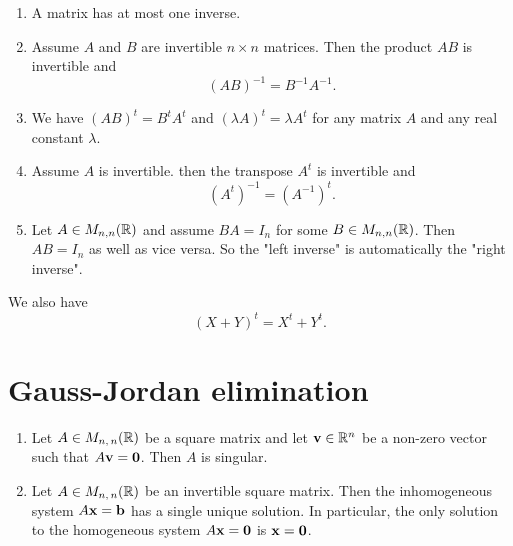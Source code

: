 \documentclass[10pt, a4paper]{article}
\begin{document}
\begin{proposition}\phantom{}
    \begin{enumerate}[label = (\roman*)]
        \item A matrix has at most one inverse.
        \item Assume $A$ and $B$ are invertible $n \times n$ matrices. Then the product $AB$ is invertible and
        \[
        (AB) ^ {-1} = B ^ {-1}A ^ {-1}.
        \]
        \item We have $(AB) ^ t = B ^ t A ^ t$ and $(\lambda A) ^ t = \lambda A ^ t$ for any matrix $A$ and any real constant $\lambda$.
        \item Assume $A$ is invertible. then the transpose $A ^ t$ is invertible and
        \[
        (A ^ t) ^ {-1} = (A ^ {-1}) ^ t.
        \]
        \item Let $A \in M_{n, n}(\mathbb{R})$ and assume $BA = I_n$ for some $B \in M_{n, n}(\mathbb{R})$. Then $AB = I_n$ as well as vice versa. So the "left inverse" is automatically the "right inverse".
    \end{enumerate}
\end{proposition}

\begin{remark}
    We also have
    \[
    (X + Y) ^ t = X ^ t + Y ^ t.
    \]
\end{remark}

\newpage

\section{Gauss-Jordan elimination}

\begin{lemma}\phantom{}
    \begin{enumerate}[label = (\roman*)]
        \item Let $A \in M_{n,\,n}(\mathbb{R})$ be a square matrix and let $\mathbf{v} \in \mathbb{R} ^ n$ be a non-zero vector such that $A\mathbf{v} = \mathbf{0}$. Then $A$ is singular.
        \item Let $A \in M_{n,\,n}(\mathbb{R})$ be an invertible square matrix. Then the inhomogeneous system $A\mathbf{x} = \mathbf{b}$ has a single unique solution. In particular, the only solution to the homogeneous system $A\mathbf{x} = \mathbf{0}$ is $\mathbf{x} = \mathbf{0}$.
    \end{enumerate}
\end{lemma}
\end{document}
